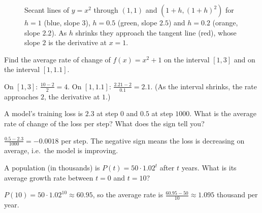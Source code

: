 \begin{figure}[htbp]
\centering
{}
\caption{Secant lines of $y = x^2$ through $(1, 1)$ and $(1 + h, (1+h)^2)$ for
  $h = 1$ (blue, slope $3$), $h = 0.5$ (green, slope $2.5$) and $h = 0.2$ (orange,
  slope $2.2$). As $h$ shrinks they approach the tangent line (red), whose slope
  $2$ is the derivative at $x = 1$.}
\label{fig:secants}
\end{figure}

\sectionexercises

\begin{exercise}
Find the average rate of change of $f(x) = x^2 + 1$ on the interval $[1, 3]$
and on the interval $[1, 1.1]$.
\end{exercise}
\begin{solution}
On $[1, 3]$: $\tfrac{10 - 2}{2} = 4$. On $[1, 1.1]$: $\tfrac{2.21 - 2}{0.1} =
2.1$. (As the interval shrinks, the rate approaches $2$, the derivative at $1$.)
\end{solution}

\begin{exercise}
A model's training loss is $2.3$ at step $0$ and $0.5$ at step $1000$. What is
the average rate of change of the loss per step? What does the sign tell you?
\end{exercise}
\begin{solution}
$\tfrac{0.5 - 2.3}{1000} = -0.0018$ per step. The negative sign means the loss
is decreasing on average, i.e.\ the model is improving.
\end{solution}

\begin{exercise}
A population (in thousands) is $P(t) = 50 \cdot 1.02^t$ after $t$ years. What
is its average growth rate between $t = 0$ and $t = 10$?
\end{exercise}
\begin{solution}
$P(10) = 50\cdot1.02^{10} \approx 60.95$, so the average rate is
$\tfrac{60.95 - 50}{10} \approx 1.095$ thousand per year.
\end{solution}

